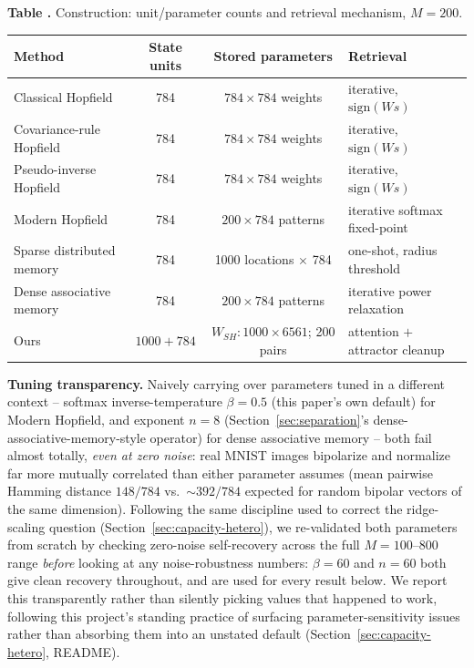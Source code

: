 \documentclass[11pt]{article}
\newcommand{\toprule}{\hline\hline}
\newcommand{\midrule}{\hline}
\newcommand{\bottomrule}{\hline\hline}
\begin{document}
\label{tab:construction}
\noindent\textbf{Table \thetable.} Construction: unit/parameter counts and retrieval mechanism, $M{=}200$.
\begin{center}
\scriptsize
\begin{tabular}{lccl}
\toprule
Method & State units & Stored parameters & Retrieval \\
\midrule
Classical Hopfield & 784 & $784{\times}784$ weights & iterative, $\mathrm{sign}(Ws)$ \\
Covariance-rule Hopfield & 784 & $784{\times}784$ weights & iterative, $\mathrm{sign}(Ws)$ \\
Pseudo-inverse Hopfield & 784 & $784{\times}784$ weights & iterative, $\mathrm{sign}(Ws)$ \\
Modern Hopfield \cite{ramsauer2020} & 784 & $200{\times}784$ patterns & iterative softmax fixed-point \\
Sparse distributed memory \cite{kanerva1988} & 784 & 1000 locations $\times$ 784 & one-shot, radius threshold \\
Dense associative memory \cite{krotov2016} & 784 & $200{\times}784$ patterns & iterative power relaxation \\
Ours & $1000{+}784$ & $W_{SH}{:}1000{\times}6561$; 200 pairs & attention $+$ attractor cleanup \\
\bottomrule
\end{tabular}
\end{center}

\textbf{Tuning transparency.} Naively carrying over parameters tuned in a different context --
softmax inverse-temperature $\beta{=}0.5$ (this paper's own default) for Modern Hopfield, and
exponent $n{=}8$ (Section~\ref{sec:separation}'s dense-associative-memory-style operator) for
dense associative memory -- both fail almost totally, \emph{even at zero noise}: real MNIST
images bipolarize and normalize far more mutually correlated than either parameter assumes
(mean pairwise Hamming distance $148/784$ vs.\ ${\sim}392/784$ expected for random bipolar
vectors of the same dimension). Following the same discipline used to correct the ridge-scaling
question (Section~\ref{sec:capacity-hetero}), we re-validated both parameters from scratch by
checking zero-noise self-recovery across the full $M{=}100$--$800$ range \emph{before} looking
at any noise-robustness numbers: $\beta{=}60$ and $n{=}60$ both give clean recovery throughout,
and are used for every result below. We report this transparently rather than silently picking
values that happened to work, following this project's standing practice of surfacing
parameter-sensitivity issues rather than absorbing them into an unstated default
(Section~\ref{sec:capacity-hetero}, README).
\end{document}
